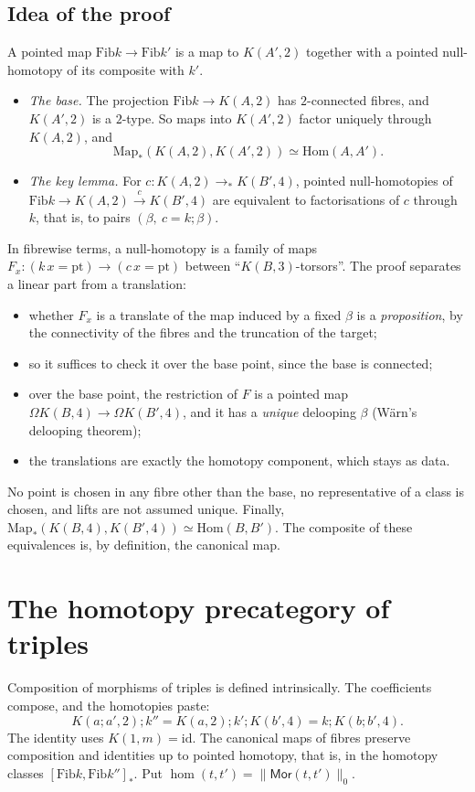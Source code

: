\documentclass[11pt]{amsart}
\theoremstyle{remark}
\newcommand{\Om}{\Omega}
\newcommand{\Fib}{\mathrm{Fib}}
\newcommand{\Map}{\mathrm{Map}_*}
\newcommand{\Mor}{\mathsf{Mor}}
\newcommand{\Hom}{\mathrm{Hom}}
\newcommand{\cmp}{\mathbin{;}}
\begin{document}
\subsection*{Idea of the proof}
A pointed map $\Fib k\to\Fib k'$ is a map to $K(A',2)$ together with a pointed
null-homotopy of its composite with $k'$.
\begin{itemize}
\item \emph{The base.} The projection $\Fib k\to K(A,2)$ has $2$-connected
fibres, and $K(A',2)$ is a $2$-type. So maps into $K(A',2)$ factor uniquely
through $K(A,2)$, and
\[\Map(K(A,2),K(A',2))\simeq\Hom(A,A').\]
\item \emph{The key lemma.} For $c:K(A,2)\to_*K(B',4)$, pointed null-homotopies
of $\Fib k\to K(A,2)\xrightarrow{c}K(B',4)$ are equivalent to factorisations of
$c$ through $k$, that is, to pairs $(\beta,\ c=k\cmp\beta)$.
\end{itemize}
In fibrewise terms, a null-homotopy is a family of maps
$F_x:(k\,x=\mathrm{pt})\to(c\,x=\mathrm{pt})$ between ``$K(B,3)$-torsors''. The
proof separates a linear part from a translation:
\begin{itemize}
\item whether $F_x$ is a translate of the map induced by a fixed $\beta$ is a
\emph{proposition}, by the connectivity of the fibres and the truncation of
the target;
\item so it suffices to check it over the base point, since the base is
connected;
\item over the base point, the restriction of $F$ is a pointed map
$\Om K(B,4)\to\Om K(B',4)$, and it has a \emph{unique} delooping $\beta$
(Wärn's delooping theorem);
\item the translations are exactly the homotopy component, which stays as data.
\end{itemize}
No point is chosen in any fibre other than the base, no representative of a
class is chosen, and lifts are not assumed unique. Finally,
$\Map(K(B,4),K(B',4))\simeq\Hom(B,B')$. The composite of these equivalences is,
by definition, the canonical map.

\section{The homotopy precategory of triples}\label{sec:cat}

Composition of morphisms of triples is defined intrinsically. The coefficients
compose, and the homotopies paste:
\[K(a\cmp a',2)\cmp k''=K(a,2)\cmp k'\cmp K(b',4)=k\cmp K(b\cmp b',4).\]
The identity uses $K(1,m)=\mathrm{id}$. The canonical maps of fibres preserve
composition and identities up to pointed homotopy, that is, in the homotopy
classes $[\Fib k,\Fib k'']_*$. Put $\hom(t,t')=\|\Mor(t,t')\|_0$.
\end{document}
